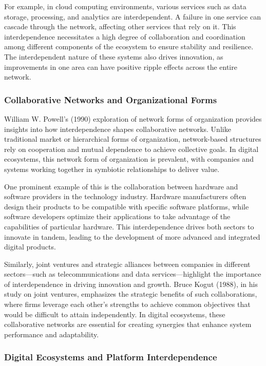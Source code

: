 \documentclass[12pt,twoside]{article}
\begin{document}
For example, in cloud computing environments, various services such as data storage, processing, and analytics are interdependent. A failure in one service can cascade through the network, affecting other services that rely on it. This interdependence necessitates a high degree of collaboration and coordination among different components of the ecosystem to ensure stability and resilience. The interdependent nature of these systems also drives innovation, as improvements in one area can have positive ripple effects across the entire network.

\subsubsection{Collaborative Networks and Organizational Forms}

William W. Powell’s (1990) exploration of network forms of organization provides insights into how interdependence shapes collaborative networks. Unlike traditional market or hierarchical forms of organization, network-based structures rely on cooperation and mutual dependence to achieve collective goals. In digital ecosystems, this network form of organization is prevalent, with companies and systems working together in symbiotic relationships to deliver value.

One prominent example of this is the collaboration between hardware and software providers in the technology industry. Hardware manufacturers often design their products to be compatible with specific software platforms, while software developers optimize their applications to take advantage of the capabilities of particular hardware. This interdependence drives both sectors to innovate in tandem, leading to the development of more advanced and integrated digital products.

Similarly, joint ventures and strategic alliances between companies in different sectors—such as telecommunications and data services—highlight the importance of interdependence in driving innovation and growth. Bruce Kogut (1988), in his study on joint ventures, emphasizes the strategic benefits of such collaborations, where firms leverage each other’s strengths to achieve common objectives that would be difficult to attain independently. In digital ecosystems, these collaborative networks are essential for creating synergies that enhance system performance and adaptability.

\subsubsection{Digital Ecosystems and Platform Interdependence}
\end{document}
